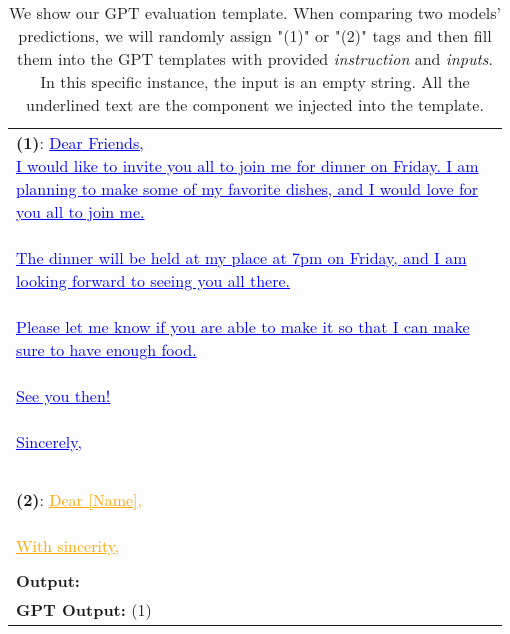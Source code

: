 \documentclass[11pt]{article}
\begin{document}
\begin{table*}
\begin{tabular}{p{0.98\linewidth}}
\\
\textbf{(1)}: \textcolor{blue}{\uline{
Dear Friends, \\
I would like to invite you all to join me for dinner on Friday. I am planning to make some of my favorite dishes, and I would love for you all to join me.
\\
\\
The dinner will be held at my place at 7pm on Friday, and I am looking forward to seeing you all there.
\\
\\
Please let me know if you are able to make it so that I can make sure to have enough food.
\\
\\
See you then!
\\
\\
Sincerely,
\\
\\
[Your Name]
}}
\\
\\
\textbf{(2)}: \textcolor{orange}{\uline{Dear [Name], \\ \\ With sincerity, \\ [Your Name]}}
\\
\\
\textbf{Output:}\\
\midrule
\textbf{GPT Output:} (1)\\
\bottomrule
\end{tabular}
\caption{We show our GPT evaluation template. When comparing two models' predictions, we will randomly assign "(1)" or "(2)" tags and then fill them into the GPT templates with provided \textit{instruction} and \textit{inputs}. In this specific instance, the input is an empty string. All the underlined text are the component we injected into the template.}
\label{tab:gpt-template}
\end{table*}




\end{document}
